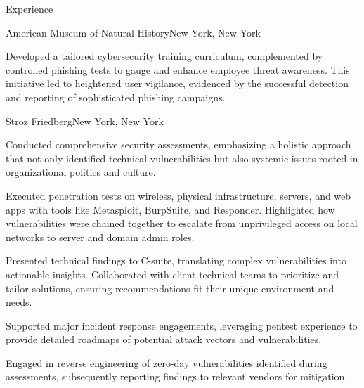 \documentclass[]{mcdowellcv}
\begin{document}
\begin{cvsection}{Experience}
\begin{jobentry}{American Museum of Natural History}{New York, New York}
\begin{jobprojects}
            \item Developed a tailored cybersecurity training curriculum, complemented by controlled phishing tests to gauge and enhance employee threat awareness. This initiative led to heightened user vigilance, evidenced by the successful detection and reporting of sophisticated phishing campaigns.
        \end{jobprojects}
    \end{jobentry}

    \begin{jobentry}{Stroz Friedberg}{New York, New York}
        \begin{jobpositions}
        \end{jobpositions}

        
        \begin{jobresponsibilities}
            \item Conducted comprehensive security assessments, emphasizing a holistic approach that not only identified technical vulnerabilities but also systemic issues rooted in organizational politics and culture.
            \item Executed penetration tests on wireless, physical infrastructure, servers, and web apps with tools like Metasploit, BurpSuite, and Responder. Highlighted how vulnerabilities were chained together to escalate from unprivileged access on local networks to server and domain admin roles.
            \item Presented technical findings to C-suite, translating complex vulnerabilities into actionable insights. Collaborated with client technical teams to prioritize and tailor solutions, ensuring recommendations fit their unique environment and needs.
            \item Supported major incident response engagements, leveraging pentest experience to provide detailed roadmaps of potential attack vectors and vulnerabilities.
            \item Engaged in reverse engineering of zero-day vulnerabilities identified during assessments, subsequently reporting findings to relevant vendors for mitigation.
        \end{jobresponsibilities}
        

\end{jobentry}
\end{cvsection}
\end{document}
